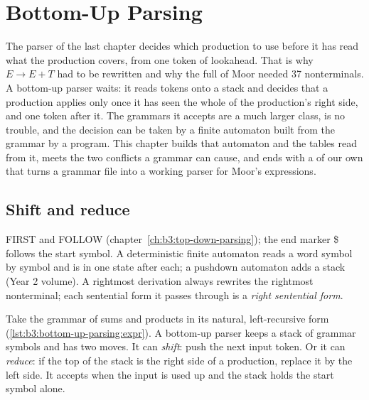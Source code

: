 \chapter{Bottom-Up Parsing}\label{ch:b3:bottom-up-parsing}

The parser of the last chapter decides which production to use before it has read what the production covers, from one token of lookahead. That is why $E \to E + T$ had to be rewritten and why the full  of Moor needed 37 nonterminals. A bottom-up parser waits: it reads tokens onto a stack and decides that a production applies only once it has seen the whole of the production's right side, and one token after it. The grammars it accepts are a much larger class,  is no trouble, and the decision can be taken by a finite automaton built from the grammar by a program. This chapter builds that automaton and the tables read from it, meets the two conflicts a grammar can cause, and ends with a  of our own that turns a grammar file into a working parser for Moor's expressions.

\section{Shift and reduce}\label{sec:b3:bottom-up-parsing:shift-reduce}

\begin{recall}
FIRST and FOLLOW (chapter~\ref{ch:b3:top-down-parsing}); the end marker \$ follows the start symbol. A deterministic finite automaton reads a word symbol by symbol and is in one state after each; a pushdown automaton adds a stack (Year 2 volume). A rightmost derivation always rewrites the rightmost nonterminal; each sentential form it passes through is a \emph{right sentential form}.
\end{recall}

Take the grammar of sums and products in its natural, left-recursive form (\cref{lst:b3:bottom-up-parsing:expr}). A bottom-up parser keeps a stack of grammar symbols and has two moves. It can \emph{shift}: push the next input token. Or it can \emph{reduce}: if the top of the stack is the right side of a production, replace it by the left side. It accepts when the input is used up and the stack holds the start symbol alone.

\label{lst:b3:bottom-up-parsing:expr}

